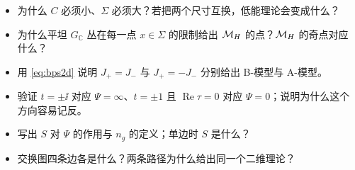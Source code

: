 \begin{checkbox}
\begin{itemize}
\item 为什么 $C$ 必须小、$\Sigma$ 必须大？若把两个尺寸互换，低能理论会变成什么？
\item 为什么平坦 $G_{\mathbb C}$ 丛在每一点 $x\in\Sigma$ 的限制给出 $\mathcal{M}_{H}$ 的点？$\mathcal{M}_{H}$ 的奇点对应什么？
\item 用 \eqref{eq:bps2d} 说明 $J_+=J_-$ 与 $J_+=-J_-$ 分别给出 B-模型与 A-模型。
\item 验证 $t=\pm\ii$ 对应 $\Psi=\infty$、$t=\pm1$ 且 $\operatorname{Re}\tau=0$ 对应 $\Psi=0$；说明为什么这个方向容易记反。
\item 写出 $S$ 对 $\Psi$ 的作用与 $n_g$ 的定义；单边时 $S$ 是什么？
\item 交换图四条边各是什么？两条路径为什么给出同一个二维理论？
\end{itemize}
\end{checkbox}
